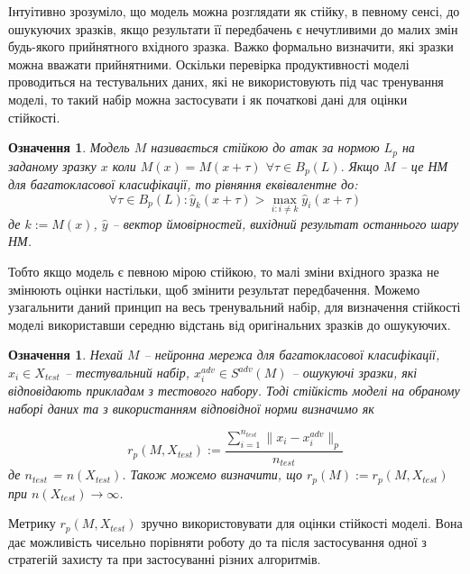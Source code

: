 \documentclass[14pt,a4paper]{extarticle}
\newcounter{e}
\newtheorem{defn}[theorem]{Означення}
\numberwithin{equation}{section}
\numberwithin{figure}{section}
\begin{document}
 Інтуітивно зрозуміло, що модель можна розглядати як стійку, в певному сенсі, до ошукуючих зразків, якщо результати її передбачень є нечутливими до малих змін будь-якого прийнятного вхідного зразка. Важко формально визначити, які зразки можна вважати прийнятними. Оскільки перевірка продуктивності моделі проводиться на тестувальних даних, які не використовують під час тренування моделі, то такий набір можна застосувати і як початкові дані для оцінки стійкості.
 
 \begin{defn}
 Модель $M$ називається стійкою до атак за нормою $L_p$ на заданому зразку $x$ коли $M(x)=M(x+\tau)$ $\forall \tau \in B_{p}(L) .$ Якщо $M$ -- це НМ для багатокласової класифікації, то рівняння еквівалентне до:
 \begin{equation}
 \forall \tau \in B_{p}(L): \hat{y}_{k}(x+\tau)>\max _{i: i \neq k} \hat{y}_{i}(x+\tau)
 \end{equation}
 де $k:=M(x)$, $\hat{y}$ -- вектор ймовірностей, вихідний результат останнього шару НМ.
 \end{defn}
 
 Тобто якщо модель є певною мірою стійкою, то малі зміни вхідного зразка не змінюють оцінки настільки, щоб змінити результат передбачення. Можемо узагальнити даний принцип на весь тренувальний набір, для визначення стійкості моделі використавши середню відстань від оригінальних зразків до ошукуючих.
 
 \begin{defn}
 Нехай $M$ -- нейронна мережа для багатокласової класифікації, $x_i \in X_{test}$ -- тестувальний набір, $x^{adv}_i \in S^{adv}(M)$ -- ошукуючі зразки, які відповідають прикладам з тестового набору. Тоді стійкість моделі на обраному наборі даних та з використанням відповідної норми визначимо як
 
 \begin{equation}
 \label{robustness-metric}
 r_p(M, X_{test}) := \frac{\sum\limits^{n_{test}}_{i = 1}\|x_i-x^{adv}_i\|_{p}}{n_{test}}
 \end{equation}
 де $n_{test}$ = $n(X_{test})$. Також можемо визначити, що $r_p(M) := r_p(M, X_{test})$ при $ n(X_{test}) \to \infty$.
 
 \end{defn}
 
 Метрику $r_p(M, X_{test})$ зручно використовувати для оцінки стійкості моделі. Вона дає можливість чисельно порівняти роботу до та після застосування одної з стратегій захисту та при застосуванні різних алгоритмів. 
 
\end{document}
